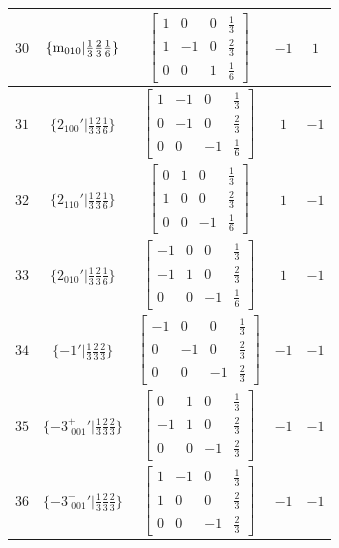 \documentclass[fleqn,8pt]{jsarticle}
\begin{document}
\begin{longtable}{ccccc}
$ 30 $ & $ \{{\rm m}_{010}|\frac{1}{3} \frac{2}{3} \frac{1}{6}\} $ & $ \begin{bmatrix} 1 & 0 & 0 & \frac{1}{3} \\ 1 & -1 & 0 & \frac{2}{3} \\ 0 & 0 & 1 & \frac{1}{6} \end{bmatrix} $ & $ -1 $ & $ 1 $ \\ \hline
$ 31 $ & $ \{2{}_{100}{}'|\frac{1}{3} \frac{2}{3} \frac{1}{6}\} $ & $ \begin{bmatrix} 1 & -1 & 0 & \frac{1}{3} \\ 0 & -1 & 0 & \frac{2}{3} \\ 0 & 0 & -1 & \frac{1}{6} \end{bmatrix} $ & $ 1 $ & $ -1 $ \\ \hline
$ 32 $ & $ \{2{}_{110}{}'|\frac{1}{3} \frac{2}{3} \frac{1}{6}\} $ & $ \begin{bmatrix} 0 & 1 & 0 & \frac{1}{3} \\ 1 & 0 & 0 & \frac{2}{3} \\ 0 & 0 & -1 & \frac{1}{6} \end{bmatrix} $ & $ 1 $ & $ -1 $ \\ \hline
$ 33 $ & $ \{2{}_{010}{}'|\frac{1}{3} \frac{2}{3} \frac{1}{6}\} $ & $ \begin{bmatrix} -1 & 0 & 0 & \frac{1}{3} \\ -1 & 1 & 0 & \frac{2}{3} \\ 0 & 0 & -1 & \frac{1}{6} \end{bmatrix} $ & $ 1 $ & $ -1 $ \\ \hline
$ 34 $ & $ \{-1{}'|\frac{1}{3} \frac{2}{3} \frac{2}{3}\} $ & $ \begin{bmatrix} -1 & 0 & 0 & \frac{1}{3} \\ 0 & -1 & 0 & \frac{2}{3} \\ 0 & 0 & -1 & \frac{2}{3} \end{bmatrix} $ & $ -1 $ & $ -1 $ \\ \hline
$ 35 $ & $ \{-3^{+}_{\,\,001}{}'|\frac{1}{3} \frac{2}{3} \frac{2}{3}\} $ & $ \begin{bmatrix} 0 & 1 & 0 & \frac{1}{3} \\ -1 & 1 & 0 & \frac{2}{3} \\ 0 & 0 & -1 & \frac{2}{3} \end{bmatrix} $ & $ -1 $ & $ -1 $ \\ \hline
$ 36 $ & $ \{-3^{-}_{\,\,001}{}'|\frac{1}{3} \frac{2}{3} \frac{2}{3}\} $ & $ \begin{bmatrix} 1 & -1 & 0 & \frac{1}{3} \\ 1 & 0 & 0 & \frac{2}{3} \\ 0 & 0 & -1 & \frac{2}{3} \end{bmatrix} $ & $ -1 $ & $ -1 $ \\
\end{longtable}
\end{document}
